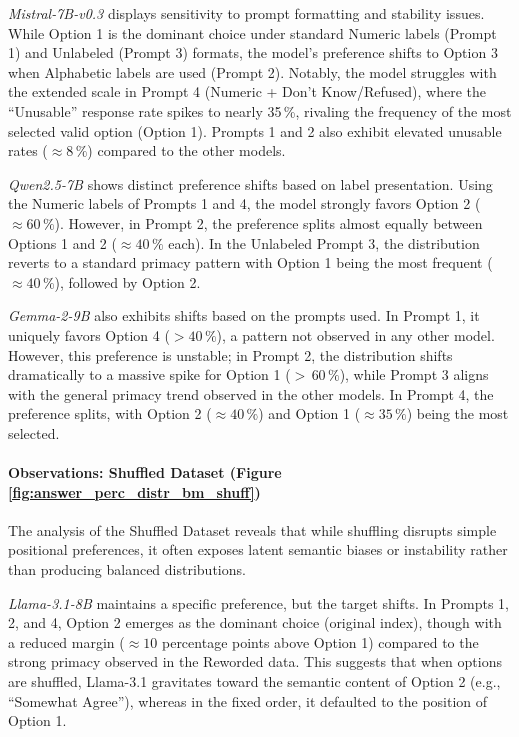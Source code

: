 \textit{Mistral-7B-v0.3} displays sensitivity to prompt formatting and stability issues. While Option 1 is the dominant choice under standard Numeric labels (Prompt 1) and Unlabeled (Prompt 3) formats, the model's preference shifts to Option 3 when Alphabetic labels are used (Prompt 2). Notably, the model struggles with the extended scale in Prompt 4 (Numeric + Don't Know/Refused), where the ``Unusable'' response rate spikes to nearly 35\,\%, rivaling the frequency of the most selected valid option (Option 1). Prompts 1 and 2 also exhibit elevated unusable rates ($\approx 8\,\%$) compared to the other models.

\textit{Qwen2.5-7B} shows distinct preference shifts based on label presentation. Using the Numeric labels of Prompts 1 and 4, the model strongly favors Option 2 ($\approx 60\,\%$). However, in Prompt 2, the preference splits almost equally between Options 1 and 2 ($\approx 40\,\%$ each). In the Unlabeled Prompt 3, the distribution reverts to a standard primacy pattern with Option 1 being the most frequent ($\approx 40\,\%$), followed by Option 2.

\textit{Gemma-2-9B} also exhibits shifts based on the prompts used. In Prompt 1, it uniquely favors Option 4 ($>40\,\%$), a pattern not observed in any other model. However, this preference is unstable; in Prompt 2, the distribution shifts dramatically to a massive spike for Option 1 ($>\,60\,\%$), while Prompt 3 aligns with the general primacy trend observed in the other models. In Prompt 4, the preference splits, with Option 2 ($\approx 40\,\%$) and Option 1 ($\approx 35\,\%$) being the most selected.

\vspace{-0.4cm}
\paragraph{Observations: Shuffled Dataset (Figure \ref{fig:answer_perc_distr_bm_shuff})}
The analysis of the Shuffled Dataset reveals that while shuffling disrupts simple positional preferences, it often exposes latent semantic biases or instability rather than producing balanced distributions.

\textit{Llama-3.1-8B} maintains a specific preference, but the target shifts. In Prompts 1, 2, and 4, Option 2 emerges as the dominant choice (original index), though with a reduced margin ($\approx 10$ percentage points above Option 1) compared to the strong primacy observed in the Reworded data. This suggests that when options are shuffled, Llama-3.1 gravitates toward the semantic content of Option 2 (e.g., ``Somewhat Agree''), whereas in the fixed order, it defaulted to the position of Option 1.

